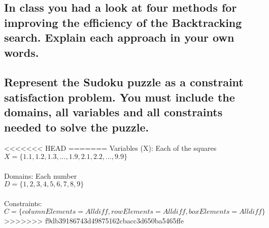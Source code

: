 \documentclass[11pt]{article}
\begin{document}
\newpage
\subsection{In class you had a look at four methods for improving the efficiency of
the Backtracking search. Explain each approach in your own words.}

\newpage
\subsection{Represent the Sudoku puzzle as a constraint satisfaction problem. You
must include the domains, all variables and all constraints needed to
solve the puzzle.}
<<<<<<< HEAD
=======
Variables (X): Each of the squares\\
$X = \{1.1, 1.2, 1.3, ..., 1.9, 2.1, 2.2, ..., 9.9\}$\\
\\
Domains: Each number\\
$D = \{1, 2, 3, 4, 5, 6, 7, 8, 9\}$\\
\\
Constraints: \\
$C = \{ column Elements = \textit{Alldiff}, rowElements = \textit{Alldiff}, boxElements = \textit{Alldiff} \}$
>>>>>>> f9db39186743d49875162cbacc3d650ba5465ffe
\end{document}
